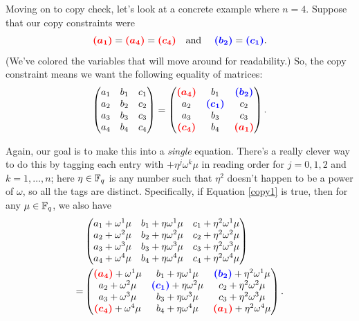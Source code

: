 Moving on to copy check, let's look at a concrete example where
$n = 4$. Suppose that our copy constraints were
\[ \textcolor{red}{\boldsymbol{(a_{1})}} =
\textcolor{red}{\boldsymbol{(a_{4})}} =
\textcolor{red}{\boldsymbol{(c_{4})}}
\quad\text{and }\quad \textcolor{blue}{\boldsymbol{(b_{2})}} = \textcolor{blue}{\boldsymbol{(c_{1})}}.\]
(We've colored the variables that will move around for
readability.) So, the copy constraint means we want the following
equality of matrices:
\begin{equation}
\label{copy1}
\begin{pmatrix}
a_{1} & b_{1} & c_{1} \\
a_{2} & b_{2} & c_{2} \\
a_{3} & b_{3} & c_{3} \\
a_{4} & b_{4} & c_{4}
\end{pmatrix} = \begin{pmatrix}
\textcolor{red}{\boldsymbol{(a_{4})}} & b_{1} & \textcolor{blue}{\boldsymbol{(b_{2})}} \\
a_{2} & \textcolor{blue}{\boldsymbol{(c_{1})}} & c_{2} \\
a_{3} & b_{3} & c_{3} \\
\textcolor{red}{\boldsymbol{(c_{4})}} & b_{4} & \textcolor{red}{\boldsymbol{(a_{1})}}
\end{pmatrix}.
\end{equation}

Again, our goal is to make this into a \emph{single} equation. There's
a really clever way to do this by tagging each entry with
$+ \eta^{j}\omega^{k}\mu$ in reading order for $j = 0,1,2$ and
$k = 1,\ldots,n$; here $\eta \in \mathbb{F}_{q}$ is any number
such that $\eta^{2}$ doesn't happen to be a power of $\omega$, so
all the tags are distinct. Specifically, if
Equation \eqref{copy1} is true, then for any
$\mu \in \mathbb{F}_{q}$, we also have
\begin{equation}
\label{copy2}
\begin{aligned}
 & \begin{pmatrix}
a_{1} + \omega^{1}\mu & b_{1} + \eta\omega^{1}\mu & c_{1} + \eta^{2}\omega^{1}\mu \\
a_{2} + \omega^{2}\mu & b_{2} + \eta\omega^{2}\mu & c_{2} + \eta^{2}\omega^{2}\mu \\
a_{3} + \omega^{3}\mu & b_{3} + \eta\omega^{3}\mu & c_{3} + \eta^{2}\omega^{3}\mu \\
a_{4} + \omega^{4}\mu & b_{4} + \eta\omega^{4}\mu & c_{4} + \eta^{2}\omega^{4}\mu
\end{pmatrix}  \\
 = & \begin{pmatrix}
\textcolor{red}{\boldsymbol{(a_{4})}} + \omega^{1}\mu & b_{1} + \eta\omega^{1}\mu & \textcolor{blue}{\boldsymbol{(b_{2})}} + \eta^{2}\omega^{1}\mu \\
a_{2} + \omega^{2}\mu & \textcolor{blue}{\boldsymbol{(c_{1})}} + \eta\omega^{2}\mu & c_{2} + \eta^{2}\omega^{2}\mu \\
a_{3} + \omega^{3}\mu & b_{3} + \eta\omega^{3}\mu & c_{3} + \eta^{2}\omega^{3}\mu \\
\textcolor{red}{\boldsymbol{(c_{4})}} + \omega^{4}\mu & b_{4} + \eta\omega^{4}\mu & \textcolor{red}{\boldsymbol{(a_{1})}} + \eta^{2}\omega^{4}\mu
\end{pmatrix}.
\end{aligned}
\end{equation}

